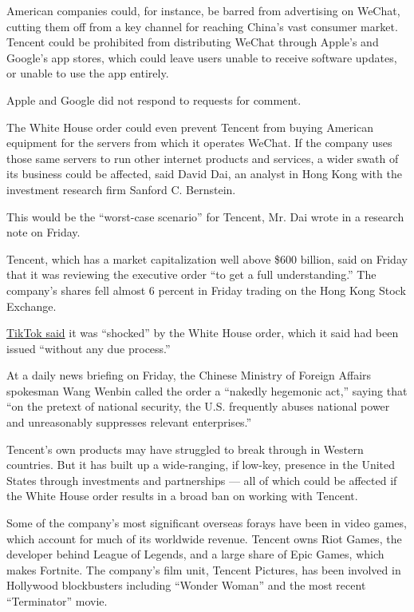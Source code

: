 American companies could, for instance, be barred from advertising on
WeChat, cutting them off from a key channel for reaching China's vast
consumer market. Tencent could be prohibited from distributing WeChat
through Apple's and Google's app stores, which could leave users unable
to receive software updates, or unable to use the app entirely.

Apple and Google did not respond to requests for comment.

The White House order could even prevent Tencent from buying American
equipment for the servers from which it operates WeChat. If the company
uses those same servers to run other internet products and services, a
wider swath of its business could be affected, said David Dai, an
analyst in Hong Kong with the investment research firm Sanford C.
Bernstein.

This would be the ``worst-case scenario'' for Tencent, Mr. Dai wrote in
a research note on Friday.

Tencent, which has a market capitalization well above \$600 billion,
said on Friday that it was reviewing the executive order ``to get a full
understanding.'' The company's shares fell almost 6 percent in Friday
trading on the Hong Kong Stock Exchange.

\href{https://newsroom.tiktok.com/en-us/tiktok-responds}{TikTok said} it
was ``shocked'' by the White House order, which it said had been issued
``without any due process.''

At a daily news briefing on Friday, the Chinese Ministry of Foreign
Affairs spokesman Wang Wenbin called the order a ``nakedly hegemonic
act,'' saying that ``on the pretext of national security, the U.S.
frequently abuses national power and unreasonably suppresses relevant
enterprises.''

Tencent's own products may have struggled to break through in Western
countries. But it has built up a wide-ranging, if low-key, presence in
the United States through investments and partnerships --- all of which
could be affected if the White House order results in a broad ban on
working with Tencent.

Some of the company's most significant overseas forays have been in
video games, which account for much of its worldwide revenue. Tencent
owns Riot Games, the developer behind League of Legends, and a large
share of Epic Games, which makes Fortnite. The company's film unit,
Tencent Pictures, has been involved in Hollywood blockbusters including
``Wonder Woman'' and the most recent ``Terminator'' movie.

